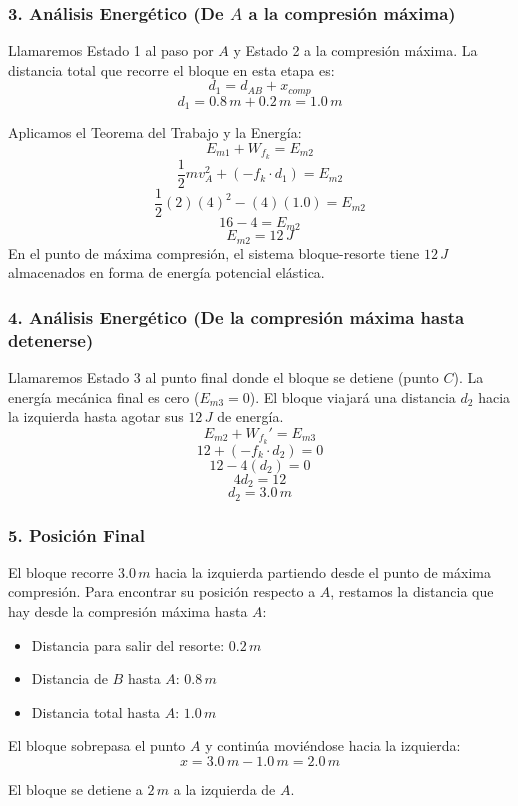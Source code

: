 \documentclass[12pt, a4paper]{article}
\begin{document}
\subsubsection*{3. Análisis Energético (De $A$ a la compresión máxima)}
Llamaremos Estado 1 al paso por $A$ y Estado 2 a la compresión máxima. La distancia total que recorre el bloque en esta etapa es:
$$ d_1 = d_{AB} + x_{comp} $$
$$ d_1 = 0.8 \, \si{m} + 0.2 \, \si{m} = 1.0 \, \si{m} $$

Aplicamos el Teorema del Trabajo y la Energía:
$$ E_{m1} + W_{f_k} = E_{m2} $$
$$ \frac{1}{2} m v_A^2 + (-f_k \cdot d_1) = E_{m2} $$
$$ \frac{1}{2}(2)(4)^2 - (4)(1.0) = E_{m2} $$
$$ 16 - 4 = E_{m2} $$
$$ E_{m2} = 12 \, \si{J} $$
En el punto de máxima compresión, el sistema bloque-resorte tiene $12 \, \si{J}$ almacenados en forma de energía potencial elástica.

\subsubsection*{4. Análisis Energético (De la compresión máxima hasta detenerse)}
Llamaremos Estado 3 al punto final donde el bloque se detiene (punto $C$). La energía mecánica final es cero ($E_{m3} = 0$). El bloque viajará una distancia $d_2$ hacia la izquierda hasta agotar sus $12 \, \si{J}$ de energía.
$$ E_{m2} + W_{f_k}' = E_{m3} $$
$$ 12 + (-f_k \cdot d_2) = 0 $$
$$ 12 - 4(d_2) = 0 $$
$$ 4d_2 = 12 $$
$$ d_2 = 3.0 \, \si{m} $$

\subsubsection*{5. Posición Final}
El bloque recorre $3.0 \, \si{m}$ hacia la izquierda partiendo desde el punto de máxima compresión. Para encontrar su posición respecto a $A$, restamos la distancia que hay desde la compresión máxima hasta $A$:
\begin{itemize}
    \item Distancia para salir del resorte: $0.2 \, \si{m}$
    \item Distancia de $B$ hasta $A$: $0.8 \, \si{m}$
    \item Distancia total hasta $A$: $1.0 \, \si{m}$
\end{itemize}

El bloque sobrepasa el punto $A$ y continúa moviéndose hacia la izquierda:
$$ x = 3.0 \, \si{m} - 1.0 \, \si{m} = 2.0 \, \si{m} $$

\begin{tcolorbox}[colback=green!5!white, colframe=green!50!black, title=Respuesta Final]
\centering \Large El bloque se detiene a $2 \, \si{m}$ a la izquierda de $A$.
\end{tcolorbox}
\end{document}
